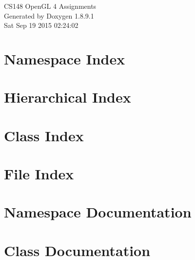 \documentclass[twoside]{book}
\newcommand{\+}{\discretionary{\mbox{\scriptsize$\hookleftarrow$}}{}{}}
\newcommand{\clearemptydoublepage}{%
  \newpage{\pagestyle{empty}\cleardoublepage}%
}
\begin{document}
\hypersetup{pageanchor=false,
             bookmarks=true,
             bookmarksnumbered=true,
             pdfencoding=unicode
            }
\begin{titlepage}
\vspace*{7cm}
\begin{center}%
{\Large C\+S148 Open\+G\+L 4 Assignments }\\
\vspace*{1cm}
{\large Generated by Doxygen 1.8.9.1}\\
\vspace*{0.5cm}
{\small Sat Sep 19 2015 02:24:02}\\
\end{center}
\end{titlepage}
\clearemptydoublepage
\tableofcontents
\clearemptydoublepage
{}
\hypersetup{pageanchor=true}

\chapter{Namespace Index}

\chapter{Hierarchical Index}

\chapter{Class Index}

\chapter{File Index}

\chapter{Namespace Documentation}



\chapter{Class Documentation}



















\end{document}
